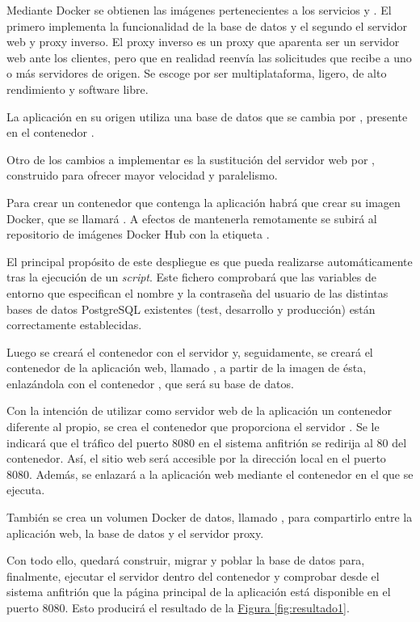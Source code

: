 Mediante Docker se obtienen las imágenes pertenecientes a los servicios  y . El primero implementa la funcionalidad de la base de datos y el segundo el servidor web y proxy inverso. El proxy inverso es un proxy que aparenta ser un servidor web ante los clientes, pero que en realidad reenvía las solicitudes que recibe a uno o más servidores de origen. Se escoge  por ser multiplataforma, ligero, de alto rendimiento y software libre.

La aplicación en su origen utiliza una base de datos  que se cambia por , presente en el contenedor . 

Otro de los cambios a implementar es la sustitución del servidor web  por , construido para ofrecer mayor velocidad y paralelismo.

Para crear un contenedor que contenga la aplicación habrá que crear su imagen Docker, que se llamará . A efectos de mantenerla remotamente se subirá al repositorio de imágenes Docker Hub con la etiqueta .

El principal propósito de este despliegue es que pueda realizarse automáticamente tras la ejecución de un \textit{script}. Este fichero comprobará que las variables de entorno que especifican el nombre y la contraseña del usuario de las distintas bases de datos PostgreSQL existentes (test, desarrollo y producción) están correctamente establecidas.

Luego se creará el contenedor  con el servidor  y, seguidamente, se creará el contenedor de la aplicación web, llamado , a partir de la imagen de ésta, enlazándola con el contenedor , que será su base de datos.

Con la intención de utilizar como servidor web de la aplicación un contenedor diferente al propio, se crea el contenedor  que proporciona el servidor . Se le indicará que el tráfico del puerto 8080 en el sistema anfitrión se redirija al 80 del contenedor. Así, el sitio web será accesible por la dirección local en el puerto 8080. Además, se enlazará a la aplicación web mediante el contenedor en el que se ejecuta.

También se crea un volumen Docker de datos, llamado , para compartirlo entre la aplicación web, la base de datos y el servidor proxy.

Con todo ello, quedará construir, migrar y poblar la base de datos para, finalmente, ejecutar el servidor  dentro del contenedor  y comprobar desde el sistema anfitrión que la página principal de la aplicación  está disponible en el puerto 8080. Esto producirá el resultado de la \hyperref[fig:resultado1]{Figura \ref{fig:resultado1}}.

